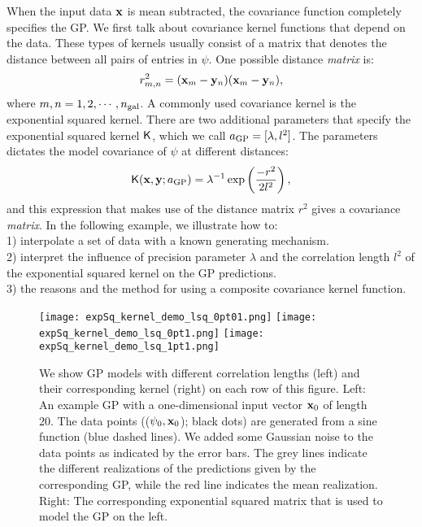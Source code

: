 When the input data $\mathbf{x}$ is mean subtracted, the covariance function  
completely specifies the GP. 
We first talk about covariance kernel functions that depend on the data. These types of kernels 
usually consist of a matrix that denotes the distance between all pairs of entries
in $\psi$. 
One possible distance {\it matrix} is: 
\begin{equation}
	r_{m, n}^2 = (\mathbf{x}_m - \mathbf{y}_n)(\mathbf{x}_m - \mathbf{y}_n),
\end{equation}
where $m, n = 1, 2, \cdots, n_{\rm gal}$.
A commonly used covariance kernel is the exponential squared kernel. There are two
additional parameters that specify the exponential squared kernel $\mathsf{K}$, 
which we call $a_{\rm GP} = [\lambda, l^2]$. The parameters dictates the model 
covariance of $\psi$ at different distances: 
\begin{equation}
	\mathsf{K}(\mathbf{x}, \mathbf{y};a_{\rm GP}) = \lambda^{-1} \exp\left(\frac{-r^2}{2 l^2}\right),
	\label{eqn:exp_sq_kernel}
\end{equation}
and this expression that makes use of the distance matrix $r^2$ gives a covariance {\it matrix}. 
In the following example, we illustrate how to: \\
1) interpolate a set of data with a known generating mechanism.
\\
2) interpret the influence of precision parameter $\lambda$ and the correlation
length $l^2$ of the exponential squared kernel on the GP predictions. \\
3) the reasons and the method for using a composite covariance kernel function.

\begin{figure}
	\centering
	\texttt{[image: expSq\_kernel\_demo\_lsq\_0pt01.png]}
	\texttt{[image: expSq\_kernel\_demo\_lsq\_0pt1.png]}
	\texttt{[image: expSq\_kernel\_demo\_lsq\_1pt1.png]}
	\caption{
		We show GP models with different correlation lengths (left) and their
		corresponding kernel (right) on each row of this figure.
		Left: An example GP with a one-dimensional input vector $\mathbf{x}_0$
		of length 20. The data points (($\psi_0, \mathbf{x}_0$); black dots) 
		are generated from a sine function (blue dashed lines).  
		We added some Gaussian noise to the data points as indicated by the error bars. 
		The grey lines indicate the different realizations of
		the predictions given by the corresponding GP, while the red line indicates the
		mean realization.  
		Right: The corresponding exponential squared matrix that is used to model
		the GP on the left. 
		\label{fig:one_d_gaussian_process}}
\end{figure}


